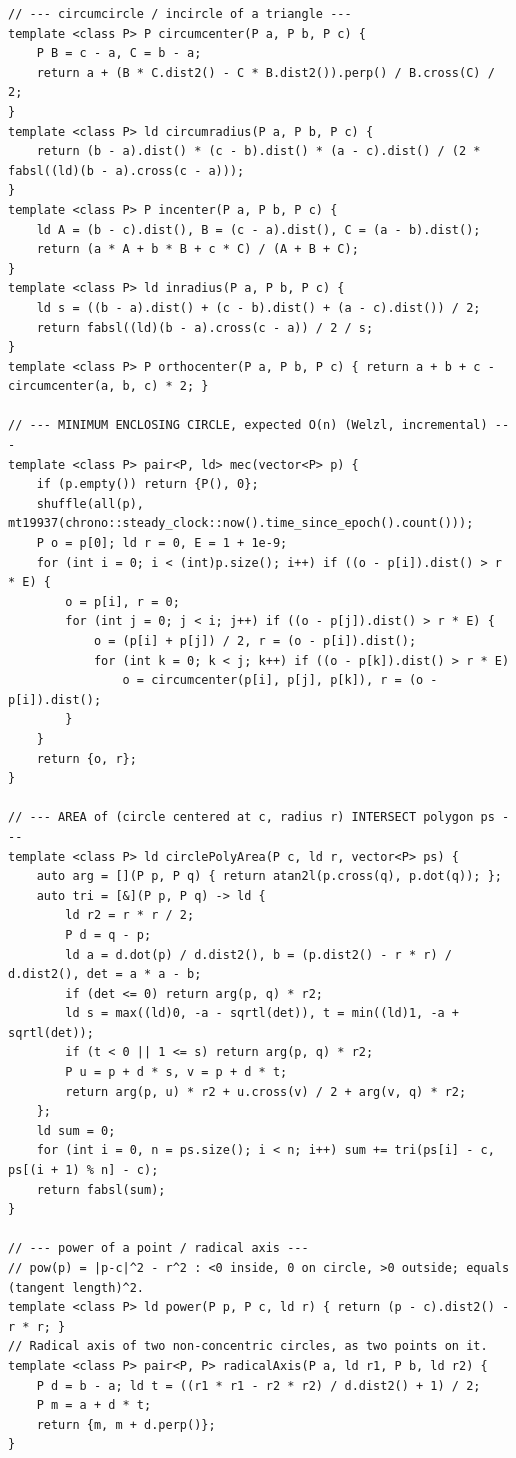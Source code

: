 \documentclass[9pt,a4paper,twocolumn]{extarticle}
\begin{document}
\begin{lstlisting}
// --- circumcircle / incircle of a triangle ---
template <class P> P circumcenter(P a, P b, P c) {
    P B = c - a, C = b - a;
    return a + (B * C.dist2() - C * B.dist2()).perp() / B.cross(C) / 2;
}
template <class P> ld circumradius(P a, P b, P c) {
    return (b - a).dist() * (c - b).dist() * (a - c).dist() / (2 * fabsl((ld)(b - a).cross(c - a)));
}
template <class P> P incenter(P a, P b, P c) {
    ld A = (b - c).dist(), B = (c - a).dist(), C = (a - b).dist();
    return (a * A + b * B + c * C) / (A + B + C);
}
template <class P> ld inradius(P a, P b, P c) {
    ld s = ((b - a).dist() + (c - b).dist() + (a - c).dist()) / 2;
    return fabsl((ld)(b - a).cross(c - a)) / 2 / s;
}
template <class P> P orthocenter(P a, P b, P c) { return a + b + c - circumcenter(a, b, c) * 2; }

// --- MINIMUM ENCLOSING CIRCLE, expected O(n) (Welzl, incremental) ---
template <class P> pair<P, ld> mec(vector<P> p) {
    if (p.empty()) return {P(), 0};
    shuffle(all(p), mt19937(chrono::steady_clock::now().time_since_epoch().count()));
    P o = p[0]; ld r = 0, E = 1 + 1e-9;
    for (int i = 0; i < (int)p.size(); i++) if ((o - p[i]).dist() > r * E) {
        o = p[i], r = 0;
        for (int j = 0; j < i; j++) if ((o - p[j]).dist() > r * E) {
            o = (p[i] + p[j]) / 2, r = (o - p[i]).dist();
            for (int k = 0; k < j; k++) if ((o - p[k]).dist() > r * E)
                o = circumcenter(p[i], p[j], p[k]), r = (o - p[i]).dist();
        }
    }
    return {o, r};
}

// --- AREA of (circle centered at c, radius r) INTERSECT polygon ps ---
template <class P> ld circlePolyArea(P c, ld r, vector<P> ps) {
    auto arg = [](P p, P q) { return atan2l(p.cross(q), p.dot(q)); };
    auto tri = [&](P p, P q) -> ld {
        ld r2 = r * r / 2;
        P d = q - p;
        ld a = d.dot(p) / d.dist2(), b = (p.dist2() - r * r) / d.dist2(), det = a * a - b;
        if (det <= 0) return arg(p, q) * r2;
        ld s = max((ld)0, -a - sqrtl(det)), t = min((ld)1, -a + sqrtl(det));
        if (t < 0 || 1 <= s) return arg(p, q) * r2;
        P u = p + d * s, v = p + d * t;
        return arg(p, u) * r2 + u.cross(v) / 2 + arg(v, q) * r2;
    };
    ld sum = 0;
    for (int i = 0, n = ps.size(); i < n; i++) sum += tri(ps[i] - c, ps[(i + 1) % n] - c);
    return fabsl(sum);
}

// --- power of a point / radical axis ---
// pow(p) = |p-c|^2 - r^2 : <0 inside, 0 on circle, >0 outside; equals (tangent length)^2.
template <class P> ld power(P p, P c, ld r) { return (p - c).dist2() - r * r; }
// Radical axis of two non-concentric circles, as two points on it.
template <class P> pair<P, P> radicalAxis(P a, ld r1, P b, ld r2) {
    P d = b - a; ld t = ((r1 * r1 - r2 * r2) / d.dist2() + 1) / 2;
    P m = a + d * t;
    return {m, m + d.perp()};
}
\end{lstlisting}
\end{document}
